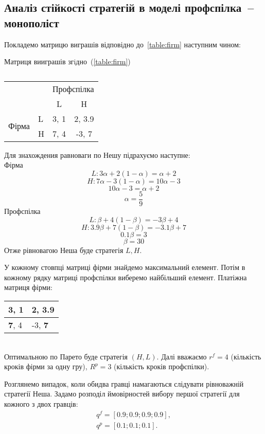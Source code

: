 \subsection{Аналіз стійкості стратегій в моделі профспілка~-- монополіст}
Покладемо матрицю виграшів відповідно до~\ref{table:firm} наступним чином:
\newpage
\begin{table}[h]
	
	\centering
	\caption{}
	Матриця вииграшів згiдно~(\ref{table:firm})\\
	\normalsize
\begin{tabular}{|l|l|c|c|}
	\hline
	\multicolumn{2}{|l|}{\multirow{2}{*}{}} & \multicolumn{2}{l|}{Профспілка} \\ \cline{3-4} 
	\multicolumn{2}{|l|}{}                  & L            & H              \\ \hline
	\multirow{2}{*}{Фірма}        & L       & 3, 1         & 2, 3.9         \\ \cline{2-4} 
	& H       & 7, 4         & -3, 7          \\ \hline
\end{tabular}
	\label{table:mono:ex}
\end{table}
Для знахождения равноваги по Нешу підрахуємо наступне: \\
Фірма
	$$ L:  3\alpha + 2(1-\alpha)=\alpha + 2$$
	$$ H: 7\alpha - 3(1-\alpha)=10\alpha - 3$$
	$$10\alpha - 3 = \alpha+2 $$
	$$\alpha = \frac{5}{9} $$
Профспілка	
	 $$L: \beta + 4(1-\beta)=-3\beta + 4$$
	 $$H: 3.9\beta + 7(1-\beta)=-3.1\beta +7$$
	$$0.1\beta  = 3 $$
	$$\beta = 30 $$
Отже рівновагою Неша буде стратегія $L,H$.

У кожному стовпці матриці фірми знайдемо максимальний елемент.
Потім в кожному рядку матриці профспілки виберемо найбільший елемент.
Платіжна матриця фірми:
\begin{table}[h]
	\centering
	\begin{tabular}{|l|l|}
		\hline
		3, 1 & \textbf{2, 3.9}  \\ \hline
		\textbf{7}, 4 & -3, \textbf{7} \\ \hline
	\end{tabular}
\end{table}\\
Оптимальною по Парето буде стратегія $ (H, L) $. Далі вважаємо $ r^f = 4 $ (кількість кроків фірми за одну гру), $ R^p = 3 $ (кількість кроків профспілки). 

 Розглянемо випадок, коли обидва гравці намагаються слідувати рівноважній стратегії
  Неша. Задамо розподіл ймовірностей вибору першої стратегії для
  кожного з двох гравців:
 \begin{gather*}
 	q^f = \left[ 0.9; 0.9; 0.9; 0.9 \right], \\
 	q^p = \left[ 0.1; 0.1; 0.1 \right].
 \end{gather*}

